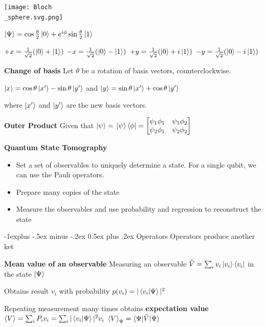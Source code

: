 \documentclass[letterpaper, 8pt]{extarticle}
\makeatletter
\renewcommand{\section}{\@startsection{section}{1}{0mm}%
                                {-1explus -.5ex minus -.2ex}%
                                {0.5ex plus .2ex}%
                                {\normalfont\normalsize\bfseries}}
\makeatother
\begin{document}
\begin{multicols*}{5}
    \texttt{[image: Bloch\\\_sphere.svg.png]}

    \(\ket{\Psi} = \cos\frac{\theta}{2}\ket{0}+e^{i \phi}\sin\frac{\theta}{2}\ket{1}\)

    \begin{multicols*}{2}
        \(+x = \frac{1}{\sqrt{2}}(\ket{0}+\ket{1})\)
        \(-x = \frac{1}{\sqrt{2}}(\ket{0}-\ket{1})\)
        \(+y = \frac{1}{\sqrt{2}}(\ket{0}+i\ket{1})\)
        \(-y = \frac{1}{\sqrt{2}}(\ket{0}-i\ket{1})\)
    \end{multicols*}

    \textbf{Change of basis}
    Let \(\theta\) be a rotation of basis vectors,
    counterclockwise.

    \(\ket{x} = \cos\theta\ket{x'} - \sin\theta\ket{y'}\)
    and
    \(\ket{y} = \sin\theta\ket{x'} + \cos\theta\ket{y'}\)

    where \(\ket{x'}\) and \(\ket{y'}\) are the new basis vectors.

    \textbf{Outer Product}
    Given that
    \(\ket{\psi} = \)
    \(\ket{\psi}\bra{\phi} = \begin{bmatrix} \psi_1\phi_1 & \psi_1\phi_2 \\ \psi_2\phi_1 & \psi_2\phi_2 \end{bmatrix}\)

    \textbf{Quantum State Tomography}
    \begin{itemize}
        \item Set a set of observables to uniquely determine a state.
              For a single qubit, we can use the Pauli operators.
        \item Prepare many copies of the state
        \item Measure the observables and use probability and regression to reconstruct the state
    \end{itemize}

    \section{Operators}
    Operators produce another ket

    \textbf{Mean value of an observable}
    Measuring an observable
    \(\hat{V} = \sum_i v_i \ket{v_i}\bra{v_i}\)
    in the state \(\ket{\Psi}\)

    Obtains result \(v_i\) with probability
    \(p(v_i) = |\braket{v_i|\Psi}|^2\)

    Repeating measurement many times obtains \textbf{expectation value}
    \(\braket{V}=\sum_i P_i v_i = \sum_i |\braket{v_i|\Psi}|^2 v_i\)
    \(\braket{V}_\Psi = \braket{\Psi|\hat{V}|\Psi}\)


\end{multicols*}
\end{document}
